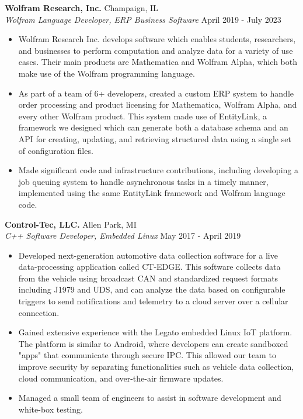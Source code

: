 \documentclass[margin,11pt]{res}
\begin{document}
\begin{resume}
\textbf{Wolfram Research, Inc.} \hfill Champaign, IL\\
\textsl{Wolfram Language Developer, ERP Business Software} \hfill April 2019 - July 2023
\begin{itemize}
    \itemsep -2pt
    \item Wolfram Research Inc. develops software which enables students,
          researchers, and businesses to perform computation and analyze data
          for a variety of use cases. Their main products are Mathematica and
          Wolfram Alpha, which both make use of the Wolfram programming language.
    \item As part of a team of 6+ developers, created a custom ERP system to
          handle order processing and product licensing for Mathematica, Wolfram
          Alpha, and every other Wolfram product. This system made use of
          EntityLink, a framework we designed which can generate both a database
          schema and an API for creating, updating, and retrieving structured
          data using a single set of configuration files.
    \item Made significant code and infrastructure contributions, including
          developing a job queuing system to handle asynchronous tasks in a
          timely manner, implemented using the same EntityLink framework and
          Wolfram language code.
\end{itemize}

\vspace{-10pt}
\textbf{Control-Tec, LLC.} \hfill Allen Park, MI\\
\textsl{C++ Software Developer, Embedded Linux} \hfill May 2017 - April 2019
\begin{itemize}
    \itemsep -2pt
    \item Developed next-generation automotive data collection software for a
          live data-processing application called CT-EDGE. This software
          collects data from the vehicle using broadcast CAN and standardized
          request formats including J1979 and UDS, and can analyze the data
          based on configurable triggers to send notifications and telemetry
          to a cloud server over a cellular connection.
    \item Gained extensive experience with the Legato embedded Linux IoT
          platform. The platform is similar to Android, where developers
          can create sandboxed "apps" that communicate through secure IPC.
          This allowed our team to improve security by separating
          functionalities such as vehicle data collection, cloud communication,
          and over-the-air firmware updates.
    \item Managed a small team of engineers to assist in software development
          and white-box testing.
\end{itemize}


\end{resume}
\end{document}
